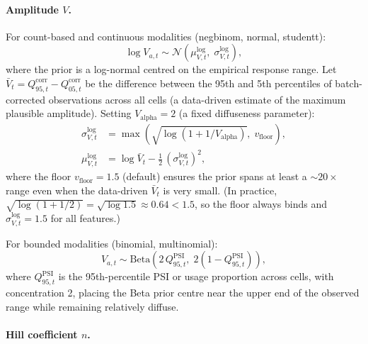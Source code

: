 \documentclass[12pt]{article}
\begin{document}
\paragraph{Amplitude $V$.}

For count-based and continuous modalities (negbinom, normal, studentt):
\begin{equation}
  \log V_{a,t} \sim \mathcal{N}\!\left(\mu_{V,t}^{\log},\; \sigma_{V,t}^{\log}\right),
\end{equation}
where the prior is a log-normal centred on the empirical response range.
Let $\bar V_t = Q_{95,t}^{\mathrm{corr}} - Q_{05,t}^{\mathrm{corr}}$ be the difference
between the 95th and 5th percentiles of batch-corrected observations across all cells
(a data-driven estimate of the maximum plausible amplitude).
Setting $V_{\mathrm{alpha}} = 2$ (a fixed diffuseness parameter):
\begin{align}
  \sigma_{V,t}^{\log} &= \max\!\left(\sqrt{\log\!\left(1 + 1/V_{\mathrm{alpha}}\right)},\; v_{\mathrm{floor}}\right), \\
  \mu_{V,t}^{\log}    &= \log\bar V_t - \tfrac12\,(\sigma_{V,t}^{\log})^2,
\end{align}
where the floor $v_{\mathrm{floor}} = 1.5$ (default) ensures the prior spans at least a
$\sim\!20\times$ range even when the data-driven $\bar V_t$ is very small.
(In practice, $\sqrt{\log(1 + 1/2)} = \sqrt{\log 1.5} \approx 0.64 < 1.5$, so the
floor always binds and $\sigma_{V,t}^{\log} = 1.5$ for all features.)

For bounded modalities (binomial, multinomial):
\begin{equation}
  V_{a,t} \sim \mathrm{Beta}\!\left(2\,Q_{95,t}^{\mathrm{PSI}},\; 2(1 - Q_{95,t}^{\mathrm{PSI}})\right),
\end{equation}
where $Q_{95,t}^{\mathrm{PSI}}$ is the 95th-percentile PSI or usage proportion across cells,
with concentration 2, placing the Beta prior centre near the upper end of the
observed range while remaining relatively diffuse.

\paragraph{Hill coefficient $n$.}
\end{document}
